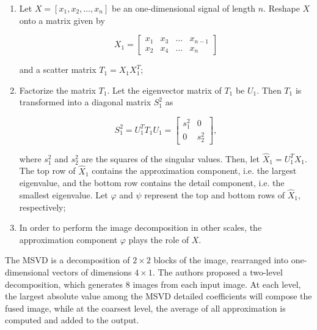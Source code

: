 \begin{enumerate}[label=\Roman* -]
    \item Let $X = [x_{1},x_{2},\dots,x_{n}]$ be an one-dimensional signal of length $n$. Reshape $X$ onto a matrix given by 
    
    \begin{equation*}
        X_{1} = \begin{bmatrix}
                x_{1} & x_{3} & \dots & x_{n-1} \\
                x_{2} & x_{4} & \dots & x_{n}
                \end{bmatrix}
    \end{equation*}
    
    and a scatter matrix $T_{1} = X_{1}X_{1}^{T}$;
    
    \item Factorize the matrix $T_{1}$. Let the eigenvector matrix of $T_{1}$ be $U_{1}$. Then $T_{1}$ is transformed into a diagonal matrix $S_{1}^{2}$ as
    
    \begin{equation*}
        S_{1}^{2} = U_{1}^{T}T_{1}U_{1} =
        \begin{bmatrix}
            s_{1}^{2} & 0\\
            0 & s_{2}^{2}
        \end{bmatrix},
    \end{equation*}
    
    where $s_{1}^{2}$ and $s_{2}^{2}$ are the squares of the singular values. Then, let $\hat{X}_{1} = U_{1}^{T}X_{1}$. The top row of $\hat{X}_{1}$ contains the approximation component, i.e. the largest eigenvalue, and the bottom row contains the detail component, i.e. the smallest eigenvalue. Let $\varphi$ and $\psi$ represent the top and bottom rows of $\hat{X}_{1}$, respectively;
    
    \item In order to perform the image decomposition in other scales, the approximation component $\varphi$ plays the role of $X$.

\end{enumerate}

The MSVD is a decomposition of $2 \times 2$ blocks of the image, rearranged into one-dimensional vectors of dimensions $4 \times 1$. The authors proposed a two-level decomposition, which generates 8 images from each input image. At each level, the largest absolute value among the MSVD detailed coefficients will compose the fused image, while at the coarsest level, the average of all approximation is computed and added to the output.